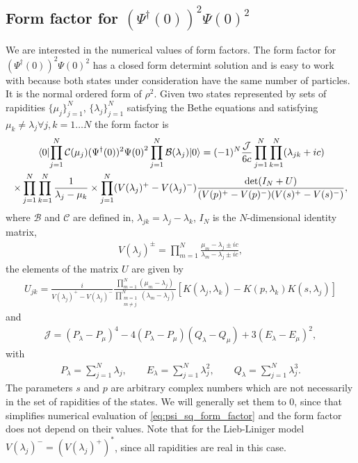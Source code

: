 \documentclass[11pt, a4paper]{report} %
\begin{document}
\subsection{Form factor for ${(\Psi^{\dag}(0))}^2{\Psi(0)}^2$}
We are interested in the numerical values of form factors.
The form factor for $(\Psi^{\dag}(0))^2\Psi(0)^2$ has a closed form determint solution and is easy to work with because both states under consideration have the same number of particles. 
It is the normal ordered form of \(\rho^2\).
Given two states represented by sets of rapidities \(\{\mu_j\}^N_{j=1}\), \(\{\lambda_j\}^N_{j=1}\) satisfying the Bethe equations and satisfying \(\mu_k\neq \lambda_j \forall j,k=1\ldots N\) the form factor is~\cite{Piroli2015}
\begin{multline}\label{eq:psi_sq_form_factor}
  \matrixel{0}{\prod_{j=1}^{N}\mathcal{C}(\mu_j) (\Psi^{\dag}(0))^2{\Psi(0)}^2 \prod_{j=1}^N\mathcal{B}(\lambda_j)}{0} =
  (-1)^N \frac{\mathcal{J}}{6c} \prod_{j=1}^{N}\prod_{k=1}^N (\lambda_{jk}+ic)\\ \times \prod_{j=1}^{N}\prod_{k=1}^N \frac{1}{\lambda_j - \mu_k}
  \times \prod_{j=1}^N(V(\lambda_j)^+ - V(\lambda_j)^-) \frac{\det(I_N + U)}{(V(p)^+ - V(p)^-)(V(s)^+ - V(s)^-)},
\end{multline}
where \(\mathcal{B}\) and \(\mathcal{C}\) are defined in, \(\lambda_{jk} = \lambda_j-\lambda_k\), \(I_N\) is the \(N\)-dimensional identity matrix,
\begin{align}
  V(\lambda_j)^{\pm} = \prod_{m=1}^N \frac{\mu_m - \lambda_j \pm ic}{\lambda_m -\lambda_j \pm ic},
\end{align}
the elements of the matrix \(U\) are given by
\begin{align}
  U_{jk} = \frac{i}{V(\lambda_j)^+ - V(\lambda_j)^-} \frac{\prod_{m=1}^N (\mu_m - \lambda_j)}{\prod_{\substack{m=1\\m\neq j}}^N (\lambda_m-\lambda_j)} \left[K(\lambda_j,\lambda_k) - K(p,\lambda_k)K(s,\lambda_j)\right]
\end{align}
and
\begin{align}
  \mathcal{J} = (P_{\lambda} - P_{\mu})^4 - 4 (P_{\lambda} - P_{\mu})(Q_{\lambda}-Q_{\mu}) + 3 (E_{\lambda} - E_{\mu})^2,
\end{align}
with
\begin{align}
  P_{\lambda} = \sum_{j=1}^N \lambda_j, \qquad E_{\lambda} = \sum_{j=1}^N \lambda_j^2, \qquad Q_{\lambda} = \sum_{j=1}^N \lambda_j^3.
\end{align}
The parameters \(s\) and \(p\) are arbitrary complex numbers which are not necessarily in the set of rapidities of the states.
We will generally set them to 0, since that simplifies numerical evaluation of \cref{eq:psi_sq_form_factor} and the form factor does not depend on their values.
Note that for the Lieb-Liniger model \(V(\lambda_j)^{-} = (V(\lambda_j)^{+})^{*}\), since all rapidities are real in this case.
\end{document}
